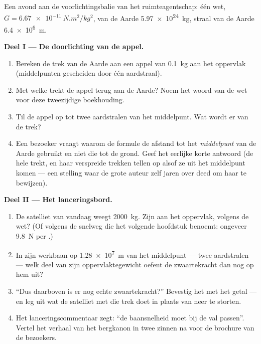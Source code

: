 \begin{problem}\label{pb:g9:gravitation:1}
Een avond aan de voorlichtingsbalie van het ruimteagentschap: één wet,
$G = \qty{6.67e-11}{N.m^2/kg^2}$,  van de Aarde
\qty{5.97e24}{kg}, straal van de Aarde \qty{6.4e6}{m}.

\medskip\noindent\textbf{Deel I --- De doorlichting van de appel.}
\begin{enumerate}
  \item Bereken de trek van de Aarde aan een appel van \qty{0.1}{kg}
        aan het oppervlak (middelpunten gescheiden door één
        aardstraal).
  \item Met welke  trekt de appel terug aan de Aarde?
        Noem het woord van de wet voor deze tweezijdige boekhouding.
  \item Til de appel op tot twee aardstralen van het middelpunt. Wat
        wordt er van de trek?
  \item Een bezoeker vraagt waarom de formule de afstand tot het
        \emph{middelpunt} van de Aarde gebruikt en niet die tot de
        grond. Geef het eerlijke korte antwoord (de hele
         trekt, en haar verspreide trekken tellen op alsof
        ze uit het middelpunt komen --- een stelling waar de grote
        auteur zelf jaren over deed om haar te bewijzen).
\end{enumerate}

\medskip\noindent\textbf{Deel II --- Het lanceringsbord.}
\begin{enumerate}[resume]
  \item De satelliet van vandaag weegt \qty{2000}{kg}. Zijn
         aan het oppervlak, volgens de wet? (Of volgens de
        snelweg die het volgende hoofdstuk benoemt: ongeveer
        \qty{9.8}{N} per .)
  \item In zijn werkbaan op \qty{1.28e7}{m} van het
        middelpunt --- twee aardstralen --- welk deel van zijn
        oppervlaktegewicht oefent de zwaartekracht dan nog op
        hem uit?
  \item ``Dus daarboven is er nog echte zwaartekracht?'' Bevestig het
        met het getal --- en leg uit wat de satelliet met die trek doet
        in plaats van neer te storten.
  \item Het lanceringscommentaar zegt: ``de baansnelheid moet
        bij de val passen''. Vertel het verhaal van het bergkanon in
        twee zinnen na voor de brochure van de bezoekers.
\end{enumerate}


\end{problem}
